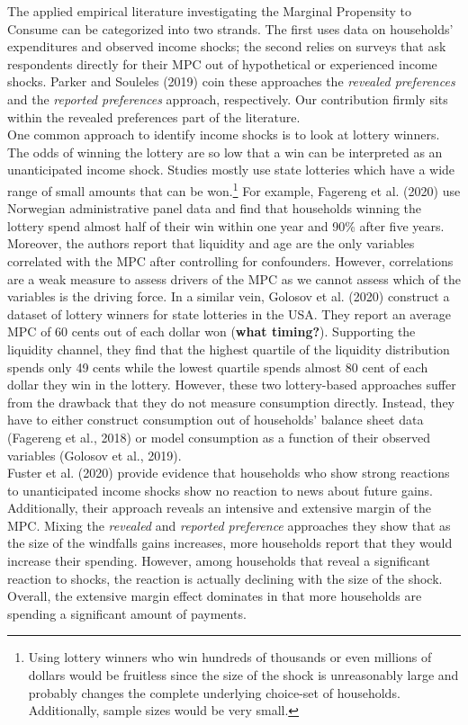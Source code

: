 The applied empirical literature investigating the Marginal Propensity to Consume can be categorized into two strands. The first uses data on households' expenditures and observed income shocks; the second relies on surveys that ask respondents directly for their MPC out of hypothetical or experienced income shocks. Parker and Souleles (2019) coin these approaches the \textit{revealed preferences} and the \textit{reported preferences} approach, respectively. Our contribution firmly sits within the revealed preferences part of the literature. \\
One common approach to identify income shocks is to look at lottery winners. The odds of winning the lottery are so low that a win can be interpreted as an unanticipated income shock. Studies mostly use state lotteries which have a wide range of small amounts that can be won.\footnote{Using lottery winners who win hundreds of thousands or even millions of dollars would be fruitless since the size of the shock is unreasonably large and probably changes the complete underlying choice-set of households. Additionally, sample sizes would be very small.} For example, Fagereng et al. (2020) use Norwegian administrative panel data and find that households winning the lottery spend almost half of their win within one year and 90\% after five years. Moreover, the authors report that liquidity and age are the only variables correlated with the MPC after controlling for confounders. However, correlations are a weak measure to assess drivers of the MPC as we cannot assess which of the variables is the driving force. In a similar vein, Golosov et al. (2020) construct a dataset of lottery winners for state lotteries in the USA. They report an average MPC of 60 cents out of each dollar won (\textbf{what timing?}). Supporting the liquidity channel, they find that the highest quartile of the liquidity distribution spends only 49 cents while the lowest quartile spends almost 80 cent of each dollar they win in the lottery. However, these two lottery-based approaches suffer from the drawback that they do not measure consumption directly. Instead, they have to either construct consumption out of households' balance sheet data (Fagereng et al., 2018) or model consumption as a function of their observed variables (Golosov et al., 2019). \\
Fuster et al. (2020) provide evidence that households who show strong reactions to unanticipated income shocks show no reaction to news about future gains. Additionally, their approach reveals an intensive and extensive margin of the MPC. Mixing the \textit{revealed} and \textit{reported preference} approaches they show that as the size of the windfalls gains increases, more households report that they would increase their spending. However, among households that reveal a significant reaction to shocks, the reaction is actually declining with the size of the shock. Overall, the extensive margin effect dominates in that more households are spending a significant amount of payments. \\
